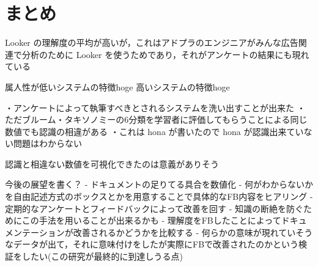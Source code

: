 \section{まとめ}
Looker の理解度の平均が高いが，これはアドプラのエンジニアがみんな広告関連で分析のために Looker を使うためであり，それがアンケートの結果にも現れている



属人性が低いシステムの特徴hoge
高いシステムの特徴hoge

・アンケートによって執筆すべきとされるシステムを洗い出すことが出来た
・ただブルーム・タキソノミーの6分類を学習者に評価してもらうことによる同じ数値でも認識の相違がある
・これは hona が書いたので hona が認識出来ていない問題はわからない


認識と相違ない数値を可視化できたのは意義がありそう


今後の展望を書く？
- ドキュメントの足りてる具合を数値化
- 何がわからないかを自由記述方式のボックスとかを用意することで具体的なFB内容をヒアリング
- 定期的なアンケートとフィードバックによって改善を回す
- 知識の断絶を防ぐためにこの手法を用いることが出来るかも
- 理解度をFBしたことによってドキュメンテーションが改善されるかどうかを比較する
- 何らかの意味が現れていそうなデータが出て，それに意味付けをしたが実際にFBで改善されたのかという検証をしたい(この研究が最終的に到達しうる点)
